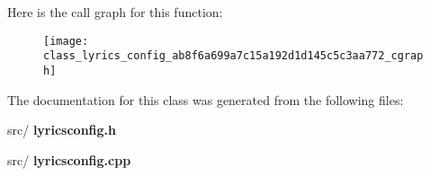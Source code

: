 Here is the call graph for this function\+:\nopagebreak
\begin{figure}[H]
\begin{center}
\leavevmode
\texttt{[image: class\_lyrics\_config\_ab8f6a699a7c15a192d1d145c5c3aa772\_cgraph]}
\end{center}
\end{figure}


The documentation for this class was generated from the following files\+:\begin{DoxyCompactItemize}
\item 
src/\textbf{ lyricsconfig.\+h}\item 
src/\textbf{ lyricsconfig.\+cpp}\end{DoxyCompactItemize}
